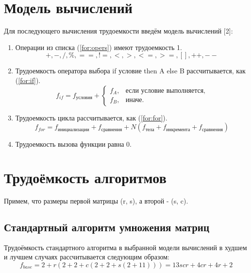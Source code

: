 \documentclass[12pt]{report}
\begin{document}
\section{Модель вычислений}

Для последующего вычисления трудоемкости введём модель вычислений [2]:

\begin{enumerate}
	\item Операции из списка (\ref{for:opers}) имеют трудоемкость 1.
	\begin{equation}
		\label{for:opers}
		+, -, /, \%, ==, !=, <, >, <=, >=, [], ++, {-}-
	\end{equation}
	\item Трудоемкость оператора выбора if условие then A else B рассчитывается, как (\ref{for:if}).
	\begin{equation}
		\label{for:if}
		f_{if} = f_{\text{условия}} +
		\begin{cases}
			f_A, & \text{если условие выполняется,}\\
			f_B, & \text{иначе.}
		\end{cases}
	\end{equation}
	\item Трудоемкость цикла рассчитывается, как (\ref{for:for}).
	\begin{equation}
		\label{for:for}
		f_{for} = f_{\text{инициализации}} + f_{\text{сравнения}} + N(f_{\text{тела}} + f_{\text{инкремента}} + f_{\text{сравнения}})
	\end{equation}
	\item Трудоемкость вызова функции равна 0.
\end{enumerate}

\section{Трудоёмкость алгоритмов}
Примем, что размеры первой матрицы (r, s), а второй - (s, c).
\subsection{Стандартный алгоритм умножения матриц}

Трудоёмкость стандартного алгоритма в выбранной модели вычислений в худшем и лучшем случаях рассчитывается следующим образом:
\begin{equation}
	f_{base} = 2 + r(2 + 2 + c(2 + 2 + s(2 + 11))) = 13scr + 4cr + 4r + 2
\end{equation}
\end{document}
